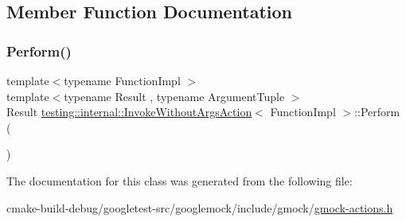 \subsection{Member Function Documentation}
\mbox{\label{classtesting_1_1internal_1_1InvokeWithoutArgsAction_abdad2b7d19ff1cbd1d07a4bd585e3f4c}} 
\subsubsection{\texorpdfstring{Perform()}{Perform()}}
{\footnotesize\ttfamily template$<$typename Function\+Impl $>$ \\
template$<$typename Result , typename Argument\+Tuple $>$ \\
Result \mbox{\hyperlink{classtesting_1_1internal_1_1InvokeWithoutArgsAction}{testing\+::internal\+::\+Invoke\+Without\+Args\+Action}}$<$ Function\+Impl $>$\+::Perform (\begin{DoxyParamCaption}\item[{const Argument\+Tuple \&}]{ }\end{DoxyParamCaption})\hspace{0.3cm}{\ttfamily [inline]}}



The documentation for this class was generated from the following file\+:\begin{DoxyCompactItemize}
\item 
cmake-\/build-\/debug/googletest-\/src/googlemock/include/gmock/\mbox{\hyperlink{gmock-actions_8h}{gmock-\/actions.\+h}}\end{DoxyCompactItemize}

